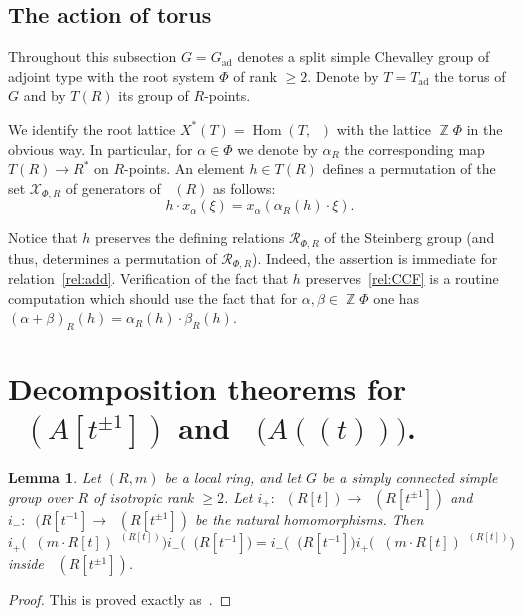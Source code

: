 \documentclass[oneside,12pt]{amsart}
\numberwithin{equation}{section}
\newtheorem{lem}{Lemma}
\numberwithin{lem}{section}
\theoremstyle{definition}
\theoremstyle{remark}
\DeclareMathOperator{\St}{St^G}
\DeclareMathOperator{\Hom}{Hom}
\DeclareMathOperator{\Gm}{{\mathbf G}_m}
\DeclareMathOperator{\ZZ}{{\mathbb Z}}
\newcommand{\ad}{\mathrm{ad}}
\begin{document}
\subsection{The action of torus}
Throughout this subsection $G=G_\ad$ denotes a split simple Chevalley group of adjoint type with the root system $\Phi$ of rank $\geq 2$.
Denote by $T = T_\ad$ the torus of $G$ and by $T(R)$ its group of $R$-points.

We identify the root lattice $X^*(T) = \Hom(T, \Gm)$ with the lattice $\ZZ \Phi$ in the obvious way.
In particular, for $\alpha \in \Phi$ we denote by $\alpha_R$ the corresponding map $T(R) \rightarrow R^*$ on $R$-points.
An element $h \in T(R)$ defines a permutation of the set $\mathcal{X}_{\Phi, R}$ of generators of $\St(R)$ as follows:
\begin{equation} h \cdot x_\alpha(\xi) = x_\alpha(\alpha_R(h) \cdot \xi). \end{equation}

Notice that $h$ preserves the defining relations $\mathcal{R}_{\Phi, R}$ of the Steinberg group (and thus, determines a permutation of $\mathcal{R}_{\Phi, R}$).
Indeed, the assertion is immediate for relation~\eqref{rel:add}.
Verification of the fact that $h$ preserves~\eqref{rel:CCF} is a routine computation which should use the fact that for $\alpha, \beta \in \ZZ \Phi$ one has $(\alpha+\beta)_R(h) = \alpha_R(h) \cdot \beta_R(h)$.

\section{Decomposition theorems for \texorpdfstring{$\St(A[t^{\pm 1}])$}{St(A[t, t\textminussuperior\textonesuperior])} and \texorpdfstring{$\St\bigl(A((t))\bigr)$}{St(A((t)))}.}

\begin{lem}
 Let $(R,m)$ be a local ring, and let $G$ be a simply connected simple group over $R$
of isotropic rank $\ge 2$. Let $i_+:\St(R[t])\to\St(R[t^{\pm 1}])$ and $i_-:\St(R[t^{-1}]\to
\St(R[t^{\pm 1}])$ be the natural homomorphisms.
Then
$$
i_+\bigl(\St(m\cdot R[t])^{\St(R[t])}\bigr)i_-\bigl(\St(R[t^{-1}]\bigr)=i_-\bigl(\St(R[t^{-1}]\bigr)
i_+\bigl(\St(m\cdot R[t])^{\St(R[t])}\bigr)
$$
inside $\St(R[t^{\pm 1}])$.
\end{lem}
\begin{proof}
This is proved exactly as~\cite[Lemma 5.12]{St-poly}.
\end{proof}
\end{document}
